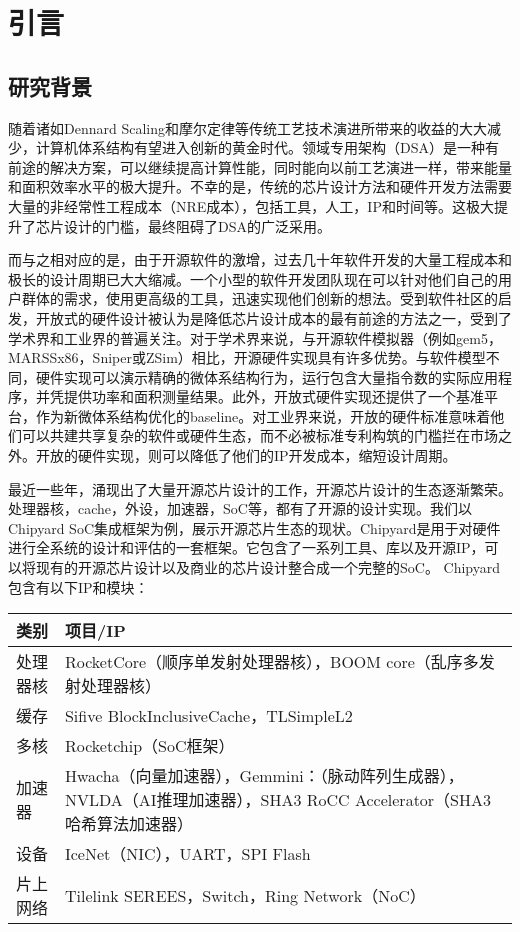 \chapter{引言}\label{chap:introduction}


\section{研究背景}

随着诸如Dennard Scaling和摩尔定律等传统工艺技术演进所带来的收益的大大减少，计算机体系结构有望进入创新的黄金时代。领域专用架构（DSA）是一种有前途的解决方案，可以继续提高计算性能，同时能向以前工艺演进一样，带来能量和面积效率水平的极大提升。不幸的是，传统的芯片设计方法和硬件开发方法需要大量的非经常性工程成本（NRE成本），包括工具，人工，IP和时间等。这极大提升了芯片设计的门槛，最终阻碍了DSA的广泛采用。

而与之相对应的是，由于开源软件的激增，过去几十年软件开发的大量工程成本和极长的设计周期已大大缩减。一个小型的软件开发团队现在可以针对他们自己的用户群体的需求，使用更高级的工具，迅速实现他们创新的想法。受到软件社区的启发，开放式的硬件设计被认为是降低芯片设计成本的最有前途的方法之一，受到了学术界和工业界的普遍关注。对于学术界来说，与开源软件模拟器（例如gem5，MARSSx86，Sniper或ZSim）相比，开源硬件实现具有许多优势。与软件模型不同，硬件实现可以演示精确的微体系结构行为，运行包含大量指令数的实际应用程序，并凭提供功率和面积测量结果。此外，开放式硬件实现还提供了一个基准平台，作为新微体系结构优化的baseline。对工业界来说，开放的硬件标准意味着他们可以共建共享复杂的软件或硬件生态，而不必被标准专利构筑的门槛拦在市场之外。开放的硬件实现，则可以降低了他们的IP开发成本，缩短设计周期。

最近一些年，涌现出了大量开源芯片设计的工作，开源芯片设计的生态逐渐繁荣。处理器核，cache，外设，加速器，SoC等，都有了开源的设计实现。我们以Chipyard SoC集成框架为例，展示开源芯片生态的现状。Chipyard是用于对硬件进行全系统的设计和评估的一套框架。它包含了一系列工具、库以及开源IP，可以将现有的开源芯片设计以及商业的芯片设计整合成一个完整的SoC。
Chipyard包含有以下IP和模块：

\begin{center}
    \begin{tabular}{lp{12cm}}
        \hline
			类别 & 项目/IP\\
        \hline
			处理器核 & RocketCore（顺序单发射处理器核），BOOM core（乱序多发射处理器核）\\
        \hline
			缓存 & Sifive BlockInclusiveCache，TLSimpleL2\\
        \hline
			多核 & Rocketchip（SoC框架）\\
        \hline
			加速器 & Hwacha（向量加速器），Gemmini：（脉动阵列生成器），NVLDA（AI推理加速器），SHA3 RoCC Accelerator（SHA3哈希算法加速器）\\
        \hline
			设备 & IceNet（NIC），UART，SPI Flash\\
        \hline
			片上网络 & Tilelink SEREES，Switch，Ring Network（NoC）\\
        \hline
    \end{tabular}
\end{center}

